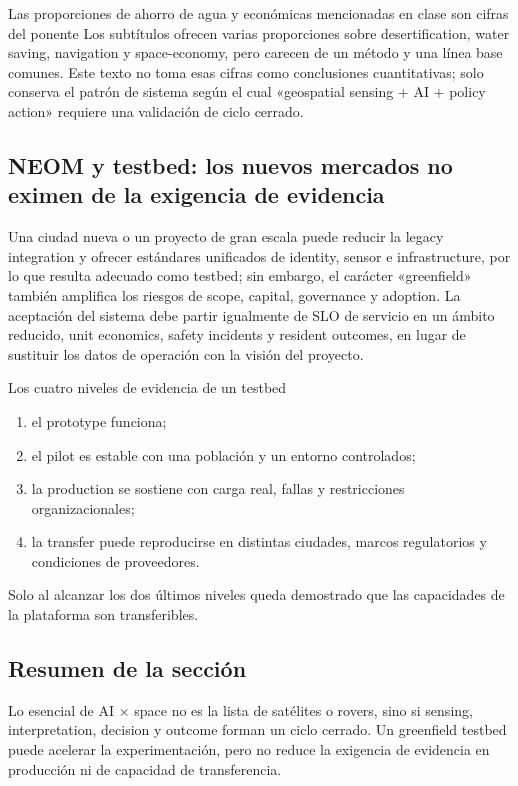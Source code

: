 \documentclass[a4paper]{article}
\begin{document}
\begin{warningbox}{Las proporciones de ahorro de agua y económicas mencionadas en clase son cifras del ponente}
Los subtítulos ofrecen varias proporciones sobre desertification, water saving, navigation y space-economy, pero carecen de un método y una línea base comunes. Este texto no toma esas cifras como conclusiones cuantitativas; solo conserva el patrón de sistema según el cual «geospatial sensing + AI + policy action» requiere una validación de ciclo cerrado.
\end{warningbox}

\subsection{NEOM y testbed: los nuevos mercados no eximen de la exigencia de evidencia}

Una ciudad nueva o un proyecto de gran escala puede reducir la legacy integration y ofrecer estándares unificados de identity, sensor e infrastructure, por lo que resulta adecuado como testbed; sin embargo, el carácter «greenfield» también amplifica los riesgos de scope, capital, governance y adoption. La aceptación del sistema debe partir igualmente de SLO de servicio en un ámbito reducido, unit economics, safety incidents y resident outcomes, en lugar de sustituir los datos de operación con la visión del proyecto.

\begin{importantbox}{Los cuatro niveles de evidencia de un testbed}
\begin{enumerate}
  \item el prototype funciona;
  \item el pilot es estable con una población y un entorno controlados;
  \item la production se sostiene con carga real, fallas y restricciones organizacionales;
  \item la transfer puede reproducirse en distintas ciudades, marcos regulatorios y condiciones de proveedores.
\end{enumerate}
Solo al alcanzar los dos últimos niveles queda demostrado que las capacidades de la plataforma son transferibles.
\end{importantbox}

\subsection{Resumen de la sección}

Lo esencial de AI × space no es la lista de satélites o rovers, sino si sensing, interpretation, decision y outcome forman un ciclo cerrado. Un greenfield testbed puede acelerar la experimentación, pero no reduce la exigencia de evidencia en producción ni de capacidad de transferencia.
\end{document}
